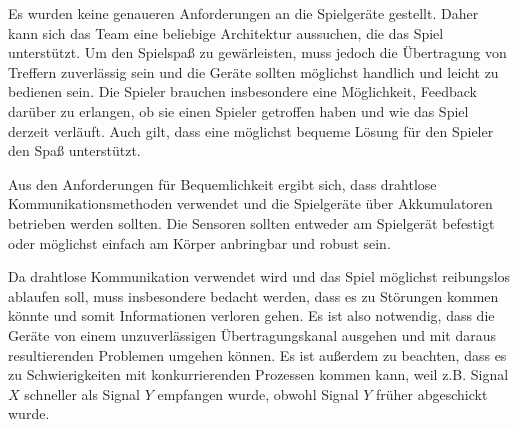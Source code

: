 Es wurden keine genaueren Anforderungen an die Spielgeräte gestellt.
Daher kann sich das Team eine beliebige Architektur aussuchen, die das Spiel unterstützt.
Um den Spielspaß zu gewärleisten, muss jedoch die Übertragung von Treffern zuverlässig sein und die
Geräte sollten möglichst handlich und leicht zu bedienen sein.
Die Spieler brauchen insbesondere eine Möglichkeit, Feedback darüber zu erlangen, ob sie einen
Spieler getroffen haben und wie das Spiel derzeit verläuft. Auch gilt, dass eine möglichst bequeme
Lösung für den Spieler den Spaß unterstützt.

Aus den Anforderungen für Bequemlichkeit ergibt sich, dass drahtlose Kommunikationsmethoden
verwendet und die Spielgeräte über Akkumulatoren betrieben werden sollten.
Die Sensoren sollten entweder am Spielgerät befestigt oder möglichst einfach am Körper anbringbar
und robust sein.

Da drahtlose Kommunikation verwendet wird und das Spiel möglichst reibungslos ablaufen soll, muss
insbesondere bedacht werden, dass es zu Störungen kommen könnte und somit Informationen verloren
gehen.
Es ist also notwendig, dass die Geräte von einem unzuverlässigen Übertragungskanal ausgehen und mit
daraus resultierenden Problemen umgehen können.
Es ist außerdem zu beachten, dass es zu Schwierigkeiten mit konkurrierenden Prozessen kommen kann,
weil z.B. Signal $X$ schneller als Signal $Y$ empfangen wurde, obwohl Signal $Y$ früher abgeschickt
wurde.
